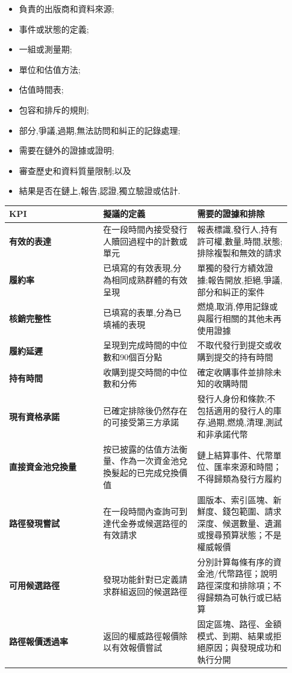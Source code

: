 \documentclass[11pt]{article}
\begin{document}
\begin{itemize}[leftmargin=*]
\item 負責的出版商和資料來源;
\item 事件或狀態的定義;
\item 一組或測量期;
\item 單位和估值方法;
\item 估值時間表;
\item 包容和排斥的規則;
\item 部分,爭議,過期,無法訪問和糾正的記錄處理;
\item 需要在鏈外的證據或證明;
\item 審查歷史和資料質量限制;以及
\item 結果是否在鏈上,報告,認證,獨立驗證或估計.
\end{itemize}
\begin{longtable}{P{0.31\linewidth} P{0.31\linewidth} P{0.31\linewidth}}
\toprule
KPI & 擬議的定義 & 需要的證據和排除 \\
\midrule
\endhead
\textbf{有效的表達} & 在一段時間內接受發行人贖回過程中的計數或單元 & 報表標識,發行人,持有許可權,數量,時間,狀態;排除複製和無效的請求 \\
\textbf{履約率} & 已填寫的有效表現,分為相同成熟群體的有效呈現 & 單獨的發行方績效證據;報告開放,拒絕,爭議,部分和糾正的案件 \\
\textbf{核銷完整性} & 已填寫的表單,分為已填補的表現 & 燃燒,取消,停用記錄或與履行相關的其他未再使用證據 \\
\textbf{履約延遲} & 呈現到完成時間的中位數和90個百分點 & 不取代發行到提交或收購到提交的持有時間 \\
\textbf{持有時間} & 收購到提交時間的中位數和分佈 & 確定收購事件並排除未知的收購時間 \\
\textbf{現有資格承諾} & 已確定排除後仍然存在的可接受第三方承諾 & 發行人身份和條款;不包括適用的發行人的庫存,過期,燃燒,清理,測試和非承諾代幣 \\
\textbf{直接資金池兌換量} & 按已披露的估值方法衡量、作為一次資金池兌換髮起的已完成兌換價值 & 鏈上結算事件、代幣單位、匯率來源和時間；不得歸類為發行方履約 \\
\textbf{路徑發現嘗試} & 在一段時間內查詢可到達代金券或候選路徑的有效請求 & 圖版本、索引區塊、新鮮度、錢包範圍、請求深度、候選數量、遺漏或搜尋預算狀態；不是權威報價 \\
\textbf{可用候選路徑} & 發現功能針對已定義請求群組返回的候選路徑 & 分別計算每條有序的資金池/代幣路徑；說明路徑深度和排除項；不得歸類為可執行或已結算 \\
\textbf{路徑報價透過率} & 返回的權威路徑報價除以有效報價嘗試 & 固定區塊、路徑、金額模式、到期、結果或拒絕原因；與發現成功和執行分開 \\

\end{longtable}
\end{document}
